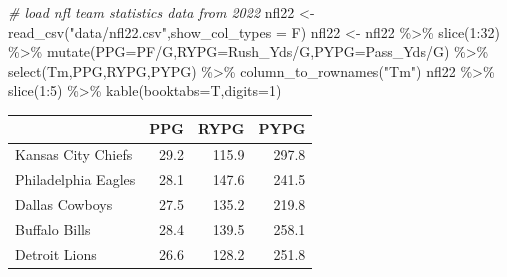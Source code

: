 \documentclass[
  11pt,
]{book}
\newenvironment{Shaded}{\begin{snugshade}}{\end{snugshade}}
\newcommand{\AttributeTok}[1]{\textcolor[rgb]{0.77,0.63,0.00}{#1}}
\newcommand{\CommentTok}[1]{\textcolor[rgb]{0.56,0.35,0.01}{\textit{#1}}}
\newcommand{\DecValTok}[1]{\textcolor[rgb]{0.00,0.00,0.81}{#1}}
\newcommand{\FunctionTok}[1]{\textcolor[rgb]{0.00,0.00,0.00}{#1}}
\newcommand{\NormalTok}[1]{#1}
\newcommand{\OtherTok}[1]{\textcolor[rgb]{0.56,0.35,0.01}{#1}}
\newcommand{\SpecialCharTok}[1]{\textcolor[rgb]{0.00,0.00,0.00}{#1}}
\newcommand{\StringTok}[1]{\textcolor[rgb]{0.31,0.60,0.02}{#1}}
\theoremstyle{definition}
\theoremstyle{definition}
\theoremstyle{definition}
\theoremstyle{definition}
\theoremstyle{remark}
\begin{document}
\begin{Shaded}
\begin{Highlighting}[]
\CommentTok{\# load nfl team statistics data from 2022}
\NormalTok{nfl22 }\OtherTok{\textless{}{-}} \FunctionTok{read\_csv}\NormalTok{(}\StringTok{"data/nfl22.csv"}\NormalTok{,}\AttributeTok{show\_col\_types =}\NormalTok{ F)}
\NormalTok{nfl22 }\OtherTok{\textless{}{-}}\NormalTok{ nfl22 }\SpecialCharTok{\%\textgreater{}\%} \FunctionTok{slice}\NormalTok{(}\DecValTok{1}\SpecialCharTok{:}\DecValTok{32}\NormalTok{) }\SpecialCharTok{\%\textgreater{}\%}
  \FunctionTok{mutate}\NormalTok{(}\AttributeTok{PPG=}\NormalTok{PF}\SpecialCharTok{/}\NormalTok{G,}\AttributeTok{RYPG=}\NormalTok{Rush\_Yds}\SpecialCharTok{/}\NormalTok{G,}\AttributeTok{PYPG=}\NormalTok{Pass\_Yds}\SpecialCharTok{/}\NormalTok{G) }\SpecialCharTok{\%\textgreater{}\%} 
  \FunctionTok{select}\NormalTok{(Tm,PPG,RYPG,PYPG) }\SpecialCharTok{\%\textgreater{}\%}
  \FunctionTok{column\_to\_rownames}\NormalTok{(}\StringTok{"Tm"}\NormalTok{)}
\NormalTok{nfl22 }\SpecialCharTok{\%\textgreater{}\%} \FunctionTok{slice}\NormalTok{(}\DecValTok{1}\SpecialCharTok{:}\DecValTok{5}\NormalTok{) }\SpecialCharTok{\%\textgreater{}\%} \FunctionTok{kable}\NormalTok{(}\AttributeTok{booktabs=}\NormalTok{T,}\AttributeTok{digits=}\DecValTok{1}\NormalTok{)}
\end{Highlighting}
\end{Shaded}

\begin{tabular}{lrrr}
\toprule
  & PPG & RYPG & PYPG\\
\midrule
Kansas City Chiefs & 29.2 & 115.9 & 297.8\\
Philadelphia Eagles & 28.1 & 147.6 & 241.5\\
Dallas Cowboys & 27.5 & 135.2 & 219.8\\
Buffalo Bills & 28.4 & 139.5 & 258.1\\
Detroit Lions & 26.6 & 128.2 & 251.8\\
\bottomrule
\end{tabular}
\end{document}
